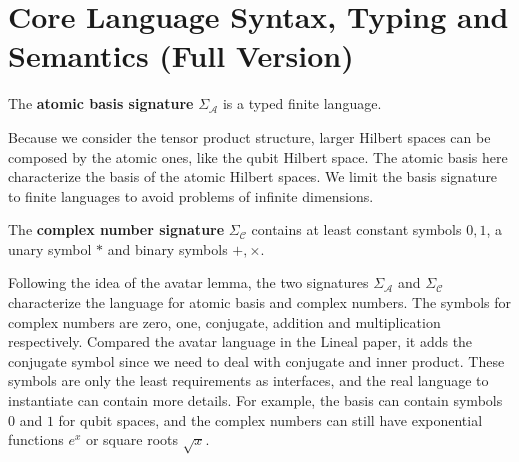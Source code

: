 \documentclass[manuscript, review, timestamp]{acmart}
\begin{document}





\clearpage
\appendix


\section{Core Language Syntax, Typing and Semantics (Full Version)}

\begin{definition} 
  The \textbf{atomic basis signature} $\Sigma_\mathcal{A}$ is a  typed finite language.
\end{definition}

Because we consider the tensor product structure, larger Hilbert spaces can be composed by the atomic ones, like the qubit Hilbert space. The atomic basis here characterize the basis of the atomic Hilbert spaces.
We limit the basis signature to finite languages to avoid problems of infinite dimensions.

\begin{definition} 
  The \textbf{complex number signature} $\Sigma_\mathcal{C}$ contains at least constant symbols $0, 1$, a unary symbol $*$ and binary symbols $+, \times$.
\end{definition}

Following the idea of the avatar lemma, the two signatures $\Sigma_\mathcal{A}$ and $\Sigma_\mathcal{C}$ characterize the language for atomic basis and complex numbers. 
The symbols for complex numbers are zero, one, conjugate, addition and multiplication respectively. Compared the avatar language in the Lineal paper\cite{Arrighi2017}, it adds the conjugate symbol since we need to deal with conjugate and inner product.
These symbols are only the least requirements as interfaces, and the real language to instantiate can contain more details. For example, the basis can contain symbols $0$ and $1$ for qubit spaces, and the complex numbers can still have exponential functions $e^x$ or square roots $\sqrt{x}$.
\end{document}
